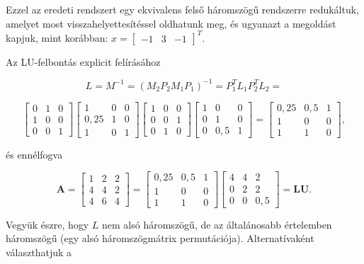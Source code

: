 \documentclass[
  magyar,
  11pt]{article}
\begin{document}
Ezzel az eredeti rendszert egy ekvivalens felső háromszögű rendszerre
redukáltuk, amelyet most visszahelyettesítéssel oldhatunk meg, és
ugyanazt a megoldást kapjuk, mint korábban:
\(x = \begin{bmatrix} -1 & 3 & -1 \end{bmatrix}^T\).

Az LU-felbontás explicit felírásához

\[L = M^{-1} = (M_2 P_2 M_1 P_1)^{-1} = P_1^T L_1 P_2^T L_2 =\]

\[\begin{bmatrix} 0 & 1 & 0 \\ 1 & 0 & 0 \\ 0 & 0 & 1 \end{bmatrix} \begin{bmatrix} 1 & 0 & 0 \\ 0{,}25 & 1 & 0 \\ 1 & 0 & 1 \end{bmatrix} \begin{bmatrix} 1 & 0 & 0 \\ 0 & 0 & 1 \\ 0 & 1 & 0 \end{bmatrix} \begin{bmatrix} 1 & 0 & 0 \\ 0 & 1 & 0 \\ 0 & 0{,}5 & 1 \end{bmatrix} = \begin{bmatrix} 0{,}25 & 0{,}5 & 1 \\ 1 & 0 & 0 \\ 1 & 1 & 0 \end{bmatrix},\]

és ennélfogva

\[\mathbf{A} = \begin{bmatrix} 1 & 2 & 2 \\ 4 & 4 & 2 \\ 4 & 6 & 4 \end{bmatrix} = \begin{bmatrix} 0{,}25 & 0{,}5 & 1 \\ 1 & 0 & 0 \\ 1 & 1 & 0 \end{bmatrix} \begin{bmatrix} 4 & 4 & 2 \\ 0 & 2 & 2 \\ 0 & 0 & 0{,}5 \end{bmatrix} = \mathbf{L}\mathbf{U}.\]

Vegyük észre, hogy \(L\) nem alsó háromszögű, de az általánosabb
értelemben háromszögű (egy alsó háromszögmátrix permutációja).
Alternatívaként választhatjuk a
\end{document}
